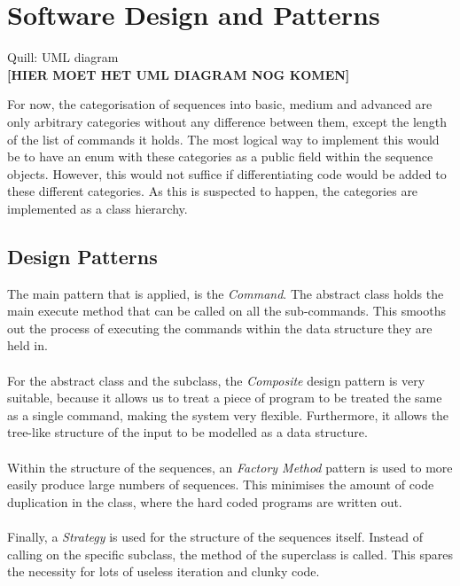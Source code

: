 \chapter{Software Design and Patterns}
Quill: UML diagram\\

\textbf{[HIER MOET HET UML DIAGRAM NOG KOMEN]}

For now, the categorisation of sequences into basic, medium and advanced are only arbitrary categories without any difference between them, except the length of the list of commands it holds. The most logical way to implement this would be to have an enum with these categories as a public field within the sequence objects. However, this would not suffice if differentiating code would be added to these different categories. As this is suspected to happen, the categories are implemented as a class hierarchy. 

\section{Design Patterns}
The main pattern that is applied, is the \textit{Command}. The  abstract class holds the main execute method that can be called on all the sub-commands. This smooths out the process of executing the commands within the data structure they are held in. \\~\\

For the  abstract class and the  subclass, the \textit{Composite} design pattern is very suitable, because it allows us to treat a piece of program to be treated the same as a single command, making the system very flexible. Furthermore, it allows the tree-like structure of the input to be modelled as a data structure. \\~\\

Within the structure of the sequences, an \textit{Factory Method} pattern is used to more easily produce large numbers of sequences. This minimises the amount of code duplication in the  class, where the hard coded programs are written out.\\~\\

Finally, a \textit{Strategy} is used for the structure of the sequences itself. Instead of calling on the specific subclass, the  method of the superclass is called. This spares the necessity for lots of useless iteration and clunky code. \\~\\

